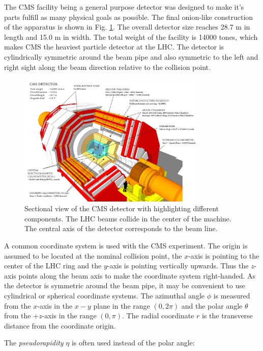 The CMS facility being a general purpose detector was designed to make it's parts fulfill as many physical goals as possible.
The final onion-like construction of the apparatus is shown in Fig. \ref{fig:CMSview}. The overall detector size reaches 28.7 m in length
and 15.0 m in width. The total weight of the facility is 14000 tones, which makes CMS the heaviest particle detector at the
LHC. The detector is cylindrically symmetric around the beam pipe and also symmetric to the left and right sight along the beam direction
relative to the collision point.

\begin{figure}
  \centering
  \includegraphics[width=0.8\textwidth]{02_experimental_setup/plots/cms_120918_03.png}
  \caption{Sectional view of the CMS detector with highlighting different components. 
  The LHC beams collide in the center of the machine. The central axis of the detector 
  corresponds to the beam line.}
  \label{fig:CMSview}
\end{figure}

A common coordinate system is used with the CMS experiment. The origin  
is assumed to be located at the nominal collision point, the $x$-axis is pointing to the center of the 
LHC ring and the $y$-axis is pointing vertically upwards. Thus the $z$-axis points along the beam axis to make
the coordinate system right-handed. As the detector is symmetric around the beam pipe, it may be convenient to use cylindrical or spherical
coordinate systems. The azimuthal angle $\phi$ is measured from the $x$-axis in the $x-y$ plane in the range $(0, 2\pi)$ 
and the polar angle $\theta$ from the $+z$-axis in the range $(0, \pi)$. The radial coordinate $r$ is the transverse distance from the coordinate origin. 

The \textit{pseudorapidity} $\eta$ is often used instead of the polar angle:

